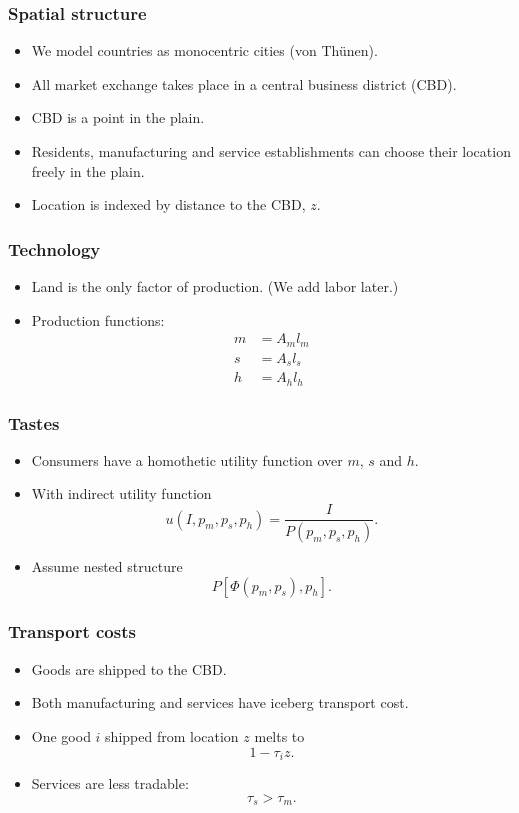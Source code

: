 \documentclass[handout,compress,mathserif]{beamer}
\begin{document}
\begin{frame}\frametitle{Spatial structure}
\begin{itemize}
    \item We model countries as monocentric cities (von Th\"unen).
	\item All market exchange takes place in a central business district (CBD).
	\item CBD is a point in the plain.
	\item Residents, manufacturing and service establishments can choose their location freely in the plain.
	\item Location is indexed by distance to the CBD, $z$.
\end{itemize}
\end{frame}


\begin{frame}\frametitle{Technology}
\begin{itemize}
    \item Land is the only factor of production. (We add labor later.)
	\item Production functions:
\begin{align*}
m&=A_ml_m\\
s&=A_sl_s\\
h&= A_hl_h
\end{align*}
\end{itemize}
\end{frame}

\begin{frame}\frametitle{Tastes}
\begin{itemize}
    \item Consumers have a homothetic utility function over $m$, $s$ and $h$.
    \item With indirect utility function
    \[
    u(I,p_m,p_s,p_h) = \frac{I}{P(p_m,p_s,p_h)}.
    \]
    \item Assume nested structure
    \[
    P[\Phi(p_m,p_s),p_h].
    \]
\end{itemize}
\end{frame}


\begin{frame}\frametitle{Transport costs}
\begin{itemize}
    \item Goods are shipped to the CBD.
    \item Both manufacturing and services have iceberg transport cost.
    \item One good $i$ shipped from location $z$ melts to
    \[
    1-\tau_iz.
    \]
    \item Services are less tradable:
    \[
    \tau_s>\tau_m.
    \]
\end{itemize}
\end{frame}
\end{document}
